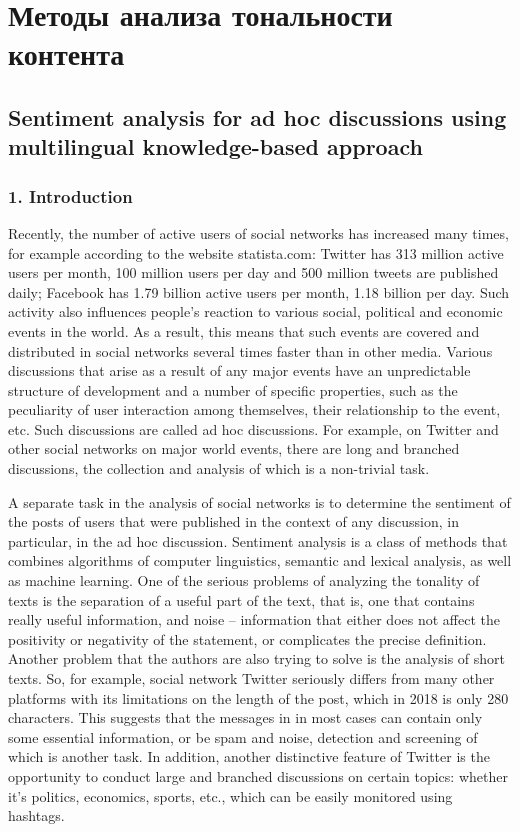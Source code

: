 \section{Методы анализа тональности контента}\label{sec:ch5/sect3}

\subsection{Sentiment analysis for ad hoc discussions using multilingual knowledge-based approach}\label{subsec:ch5/sec3/sub1}

\subsubsection{1. Introduction}

Recently, the number of active users of social networks has increased many times, for example according to the website statista.com: Twitter has 313 million active users per month, 100 million users per day and 500 million tweets are published daily; Facebook has 1.79 billion active users per month, 1.18 billion per day. Such activity also influences people’s reaction to various social, political and economic events in the world. As a result, this means that such events are covered and distributed in social networks several times faster than in other media. Various discussions that arise as a result of any major events have an unpredictable structure of development and a number of specific properties, such as the peculiarity of user interaction among themselves, their relationship to the event, etc. Such discussions are called ad hoc discussions. For example, on Twitter and other social networks on major world events, there are long and branched discussions, the collection and analysis of which is a non-trivial task.

A separate task in the analysis of social networks is to determine the sentiment of the posts of users that were published in the context of any discussion, in particular, in the ad hoc discussion. Sentiment analysis \cite{Liu} is a class of methods that combines algorithms of computer linguistics, semantic and lexical analysis, as well as machine learning. One of the serious problems of analyzing the tonality of texts is the separation of a useful part of the text, that is, one that contains really useful information, and noise -- information that either does not affect the positivity or negativity of the statement, or complicates the precise definition. Another problem that the authors are also trying to solve is the analysis of short texts. So, for example, social network Twitter seriously differs from many other platforms with its limitations on the length of the post, which in 2018 is only 280 characters. This suggests that the messages in in most cases can contain only some essential information, or be spam and noise, detection and screening of which is another task. In addition, another distinctive feature of Twitter is the opportunity to conduct large and branched discussions on certain topics: whether it’s politics, economics, sports, etc., which can be easily monitored using hashtags.

